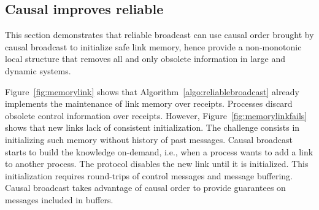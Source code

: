\subsection{Causal improves reliable}





This section demonstrates that reliable broadcast can use causal order brought
by causal broadcast to initialize safe link memory, hence provide a
non-monotonic local structure that removes all and only obsolete information in
large and dynamic systems.

Figure~\ref{fig:memorylink} shows that Algorithm~\ref{algo:reliablebroadcast}
already implements the maintenance of link memory over receipts. Processes
discard obsolete control information over receipts.  However,
Figure~\ref{fig:memorylinkfails} shows that new links lack of consistent
initialization. The challenge consists in initializing such memory without
history of past messages. Causal broadcast starts to build the knowledge
on-demand, i.e., when a process wants to add a link to another process.  The
protocol disables the new link until it is initialized. This initialization
requires round-trips of control messages and message buffering.  Causal
broadcast takes advantage of causal order to provide guarantees on messages
included in buffers.

